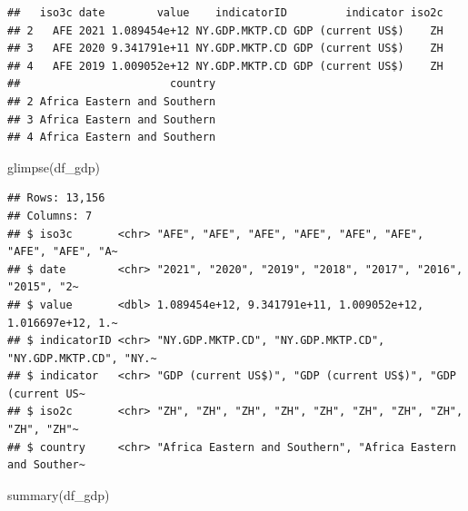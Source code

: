 \documentclass[
  12pt,
  oneside]{book}
\newenvironment{Shaded}{\begin{snugshade}}{\end{snugshade}}
\newcommand{\AttributeTok}[1]{\textcolor[rgb]{0.77,0.63,0.00}{#1}}
\newcommand{\CommentTok}[1]{\textcolor[rgb]{0.56,0.35,0.01}{\textit{#1}}}
\newcommand{\DecValTok}[1]{\textcolor[rgb]{0.00,0.00,0.81}{#1}}
\newcommand{\FunctionTok}[1]{\textcolor[rgb]{0.00,0.00,0.00}{#1}}
\newcommand{\NormalTok}[1]{#1}
\newcommand{\OtherTok}[1]{\textcolor[rgb]{0.56,0.35,0.01}{#1}}
\newcommand{\StringTok}[1]{\textcolor[rgb]{0.31,0.60,0.02}{#1}}
\theoremstyle{definition}
\theoremstyle{definition}
\theoremstyle{definition}
\theoremstyle{definition}
\theoremstyle{remark}
\begin{document}
\begin{Shaded}
\end{Shaded}

\begin{verbatim}
##   iso3c date        value    indicatorID         indicator iso2c
## 2   AFE 2021 1.089454e+12 NY.GDP.MKTP.CD GDP (current US$)    ZH
## 3   AFE 2020 9.341791e+11 NY.GDP.MKTP.CD GDP (current US$)    ZH
## 4   AFE 2019 1.009052e+12 NY.GDP.MKTP.CD GDP (current US$)    ZH
##                       country
## 2 Africa Eastern and Southern
## 3 Africa Eastern and Southern
## 4 Africa Eastern and Southern
\end{verbatim}

\begin{Shaded}
\begin{Highlighting}[]
\FunctionTok{glimpse}\NormalTok{(df\_gdp)}
\end{Highlighting}
\end{Shaded}

\begin{verbatim}
## Rows: 13,156
## Columns: 7
## $ iso3c       <chr> "AFE", "AFE", "AFE", "AFE", "AFE", "AFE", "AFE", "AFE", "A~
## $ date        <chr> "2021", "2020", "2019", "2018", "2017", "2016", "2015", "2~
## $ value       <dbl> 1.089454e+12, 9.341791e+11, 1.009052e+12, 1.016697e+12, 1.~
## $ indicatorID <chr> "NY.GDP.MKTP.CD", "NY.GDP.MKTP.CD", "NY.GDP.MKTP.CD", "NY.~
## $ indicator   <chr> "GDP (current US$)", "GDP (current US$)", "GDP (current US~
## $ iso2c       <chr> "ZH", "ZH", "ZH", "ZH", "ZH", "ZH", "ZH", "ZH", "ZH", "ZH"~
## $ country     <chr> "Africa Eastern and Southern", "Africa Eastern and Souther~
\end{verbatim}

\begin{Shaded}
\begin{Highlighting}[]
\FunctionTok{summary}\NormalTok{(df\_gdp)}
\end{Highlighting}
\end{Shaded}
\end{document}
